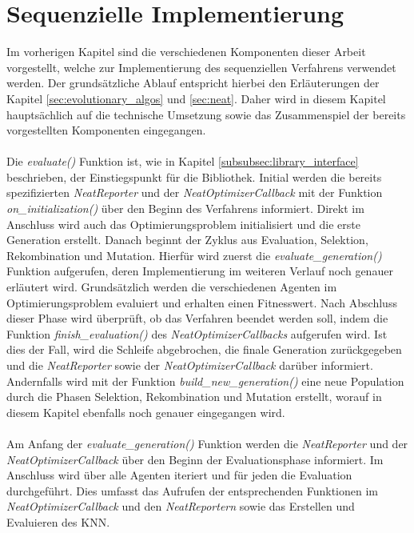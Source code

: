 \section{Sequenzielle Implementierung}
\label{sec:sequential_implementation}
Im vorherigen Kapitel sind die verschiedenen Komponenten dieser Arbeit vorgestellt, welche zur Implementierung des sequenziellen Verfahrens verwendet werden. Der grundsätzliche Ablauf entspricht hierbei den Erläuterungen der Kapitel \ref{sec:evolutionary_algos} und \ref{sec:neat}. Daher wird in diesem Kapitel hauptsächlich auf die technische Umsetzung sowie das Zusammenspiel der bereits vorgestellten Komponenten eingegangen. 
\\\\
Die \emph{evaluate()} Funktion ist, wie in Kapitel \ref{subsubsec:library_interface} beschrieben, der Einstiegspunkt für die Bibliothek. Initial werden die bereits spezifizierten \emph{NeatReporter} und der \emph{NeatOptimizerCallback} mit der Funktion \emph{on\_initialization()} über den Beginn des Verfahrens informiert. Direkt im Anschluss wird auch das Optimierungsproblem initialisiert und die erste Generation erstellt. Danach beginnt der Zyklus aus Evaluation, Selektion, Rekombination und Mutation. Hierfür wird zuerst die \emph{evaluate\_generation()} Funktion aufgerufen, deren Implementierung im weiteren Verlauf noch genauer erläutert wird. Grundsätzlich werden die verschiedenen Agenten im Optimierungsproblem evaluiert und erhalten einen Fitnesswert. Nach Abschluss dieser Phase wird überprüft, ob das Verfahren beendet werden soll, indem die Funktion \emph{finish\_evaluation()} des \emph{NeatOptimizerCallbacks} aufgerufen wird. Ist dies der Fall, wird die Schleife abgebrochen, die finale Generation zurückgegeben und die \emph{NeatReporter} sowie der \emph{NeatOptimizerCallback} darüber informiert. Andernfalls wird mit der Funktion \emph{build\_new\_generation()} eine neue Population durch die Phasen Selektion, Rekombination und Mutation erstellt, worauf in diesem Kapitel ebenfalls noch genauer eingegangen wird. 
\\\\
Am Anfang der \emph{evaluate\_generation()} Funktion werden die \emph{NeatReporter} und der \emph{NeatOptimizerCallback} über den Beginn der Evaluationsphase informiert. Im Anschluss wird über alle Agenten iteriert und für jeden die Evaluation durchgeführt. Dies umfasst das Aufrufen der entsprechenden Funktionen im \emph{NeatOptimizerCallback} und den \emph{NeatReportern} sowie das Erstellen und Evaluieren des \ac{KNN}.
\\\\
